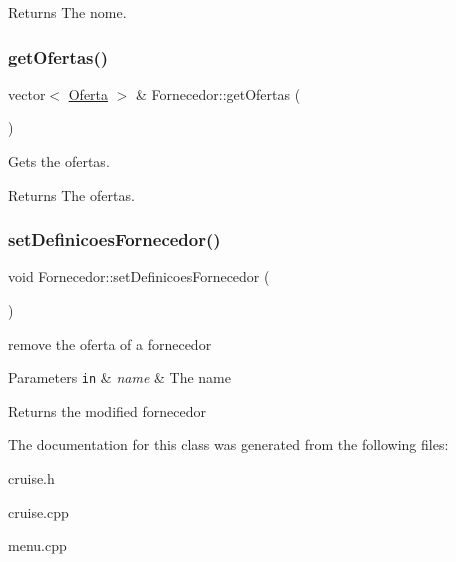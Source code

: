 \begin{DoxyReturn}{Returns}
The nome. 
\end{DoxyReturn}
\mbox{\label{classFornecedor_a7ef7f5f79e2c61aaca5d60c06b2a0051}} 
\subsubsection{\texorpdfstring{get\+Ofertas()}{getOfertas()}}
{\footnotesize\ttfamily vector$<$ \hyperlink{classOferta}{Oferta} $>$ \& Fornecedor\+::get\+Ofertas (\begin{DoxyParamCaption}{ }\end{DoxyParamCaption})}



Gets the ofertas. 

\begin{DoxyReturn}{Returns}
The ofertas. 
\end{DoxyReturn}
\mbox{\label{classFornecedor_a0a0945cbd2fd120d9eab5d5aec441b72}} 
\subsubsection{\texorpdfstring{set\+Definicoes\+Fornecedor()}{setDefinicoesFornecedor()}}
{\footnotesize\ttfamily void Fornecedor\+::set\+Definicoes\+Fornecedor (\begin{DoxyParamCaption}{ }\end{DoxyParamCaption})}



remove the oferta of a fornecedor 


\begin{DoxyParams}[1]{Parameters}
\mbox{\tt in}  & {\em name} & The name\\
\hline
\end{DoxyParams}
\begin{DoxyReturn}{Returns}
the modified fornecedor 
\end{DoxyReturn}


The documentation for this class was generated from the following files\+:\begin{DoxyCompactItemize}
\item 
cruise.\+h\item 
cruise.\+cpp\item 
menu.\+cpp\end{DoxyCompactItemize}
